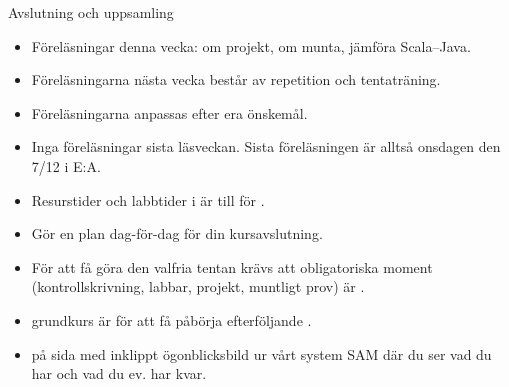 

\begin{SlideExtra}{Avslutning och uppsamling}

\begin{itemize}\SlideFontSmall

\item Föreläsningar denna vecka: om projekt, om munta, jämföra Scala--Java.

\item Föreläsningarna nästa vecka består av repetition och tentaträning.

\item Föreläsningarna anpassas efter era önskemål. %

\item Inga föreläsningar sista läsveckan. Sista föreläsningen är alltså onsdagen den 7/12 i E:A.

\item Resurstider och labbtider i  är till för .

\item Gör en  plan dag-för-dag för din kursavslutning.

\item För att få göra den valfria tentan krävs att  obligatoriska moment (kontrollskrivning, labbar, projekt, muntligt prov) är . 

\item {} grundkurs är  för att få påbörja efterföljande .

\item {} på sida med inklippt ögonblicksbild ur vårt system SAM där du ser vad du har  och vad du ev. har kvar.

\end{itemize}

\end{SlideExtra}

